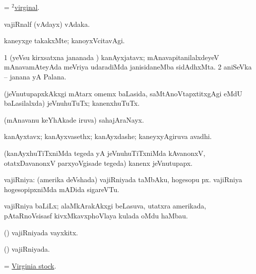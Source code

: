 \noindent 
\gl{\pagu}
\expl{}
\bmng
  = \hyperlink{virginal(2)}{$^2$virginal}. 
\emng
\eentry

\bentry
{} 
\gl{\nA}
\expl{}
\bmng
 vajiRnalf (vAdayx) vAdaka. 
\emng
\eentry

\bentry
{} 
\gl{\kirxvi}
\expl{}
\bmng
 kaneyxge takakxMte; kanoyxVcitavAgi. 
\emng
\eentry

\bentry
{}
\gl{\nA}
\expl{}
\bmng
\bnum
\num{1} (yeVsu kirxsatxna jananada \vi) kanAyxjatavx; mAnavapitanilalxdeyeV mAnavamAteyAda meVriya udaradiMda janisidaneMba sidAdhxMta. 
\num{2} aniSeVka -- janana yA Palana. 
\enum
\emng
\eentry

\bentry
{}
\gl{\nA}
\expl{}
\bmng
 (jeVnutupapxkAkxgi mAtarx omemx baLasida, saMtAnoVtapxtitxgAgi eMdU baLasilalxda) jeVnuhuTuTx; kanenxhuTuTx. 
\emng
\eentry

\bentry
{} 
\gl{\nA}
\expl{}
\bmng
 (mAnavanu keYhAkade iruva) sahajAraNayx. 
\emng
\eentry

\bentry 
{} 
\gl{\nA}
\expl{}
\bmng
 kanAyxtavx; kanAyxvasethx; kanAyxdashe; kaneyxyAgiruva avadhi. 
\emng
\eentry

\bentry 
{}
\gl{\nA}
\expl{}
\bmng
 (kanAyxhuTiTxniMda tegeda yA jeVnuhuTiTxniMda kAvanonxV, otatxDavanonxV parxyoVgisade tegeda) kanenx jeVnutupapx. 
\emng
\eentry

\bentry 
{} 
\gl{\nA}
\expl{}
\bmng
 vajiRniya: 
\banum
{} (amerika deVshada) vajiRniyada taMbAku, hogesopu px. 
 vajiRniya hogesopipxniMda mADida sigareVTu. 
\eanum
\emng
\eentry

\bentry
{}
\gl{\nA}
\expl{}
\bmng
vajiRniya baLiLx; alaMkArakAkxgi beLasuva, utatxra amerikada, pAtaRnoVsisasf kivxMkavxphoVlaya kulada oMdu haMbau. 
\emng
\eentry

\bentry 
{} 
\gl{\nA}
\expl{}
\bmng
 (\ame) vajiRniyada vayxkitx. 
\emng
\eentry

\bentry
{} 
\gl{\gu}
\expl{}
\bmng
 (\ame) vajiRniyada. 
\emng
\eentry

\bentry
{}
\gl{\nA}
\expl{}
\bmng
 = \hyperlink{Virginia stock}{Virginia stock}. 
\emng
\eentry

